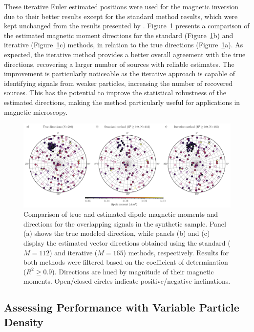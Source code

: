 These iterative Euler estimated positions were used for the magnetic inversion due to their better results except for the standard method results, which were kept unchanged from the results presented by \citet{Souza-Junior2024}. Figure~\ref{inversion2} presents a comparison of the estimated magnetic moment directions for the standard (Figure~\ref{inversion2}b) and iterative (Figure~\ref{inversion2}c) methods, in relation to the true directions (Figure~\ref{inversion2}a). As expected, the iterative method provides a better overall agreement with the true directions, recovering a larger number of sources with reliable estimates. The improvement is particularly noticeable as the iterative approach is capable of identifying signals from weaker particles, increasing the number of recovered sources. This has the potential to improve the statistical robustness of the estimated directions, making the method particularly useful for applications in magnetic microscopy.


\begin{figure}[tb!]
  \centering
  \includegraphics[width=1\linewidth]{paper/figures/synthetic-data-stereograms-comparison.png}
  \caption{
    Comparison of true and estimated dipole magnetic moments and directions for the overlapping signals in the synthetic sample. Panel (a) shows the true modeled direction, while panels (b) and (c) display the estimated vector directions obtained using the standard ($M = 112$) and iterative ($M = 165$) methods, respectively. Results for both methods were filtered based on the coefficient of determination ($R^2 \geq 0.9$). Directions are hued by magnitude of their magnetic moments. Open/closed circles indicate positive/negative inclinations.
  }
  \label{inversion2}
\end{figure}



\subsection{Assessing Performance with Variable Particle Density}

